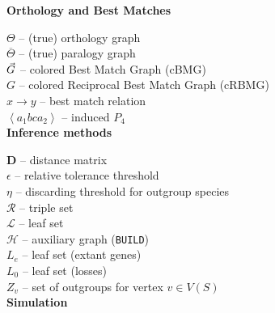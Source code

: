 \documentclass[hidelinks,11pt]{scrreprt}
\def\arrowedvec{\mathaccent"017E}
\newcommand{\G}{\arrowedvec{G}}
\newcommand{\unrooted}[1]{\overline{#1}}
\begin{document}
{\begin{minipage}[t]{0.47\textwidth}
		\noindent
		\textbf{Orthology and Best Matches}
		
		\vspace{2mm}
		\noindent
		$\Theta$ -- (true) orthology graph\\
		$\unrooted{\Theta}$ -- (true) paralogy graph\\
		$\G$ -- colored Best Match Graph (cBMG)\\
		$G$ -- colored Reciprocal Best Match Graph (cRBMG)\\
		$x \rightarrow y$ -- best match relation\\
		$\left< a_1bca_2\right>$ -- induced $P_4$\\
		
		\noindent
		\textbf{Inference methods}
		
		\vspace{2mm}
		\noindent
		$\mathbf{D}$ -- distance matrix\\
		$\epsilon$ -- relative tolerance threshold\\
		$\eta$ -- discarding threshold for outgroup species\\
		$\mathscr{R}$ -- triple set\\
		$\mathscr{L}$ -- leaf set\\
		$\mathscr{H}$ -- auxiliary graph (\texttt{BUILD})\\
		$L_e$ -- leaf set (extant genes)\\
		$L_0$ -- leaf set (losses)\\
		$Z_v$ -- set of outgroups for vertex $v\in V(S)$\\
		
		\noindent
		\textbf{Simulation}
		

\end{minipage}}
\end{document}
